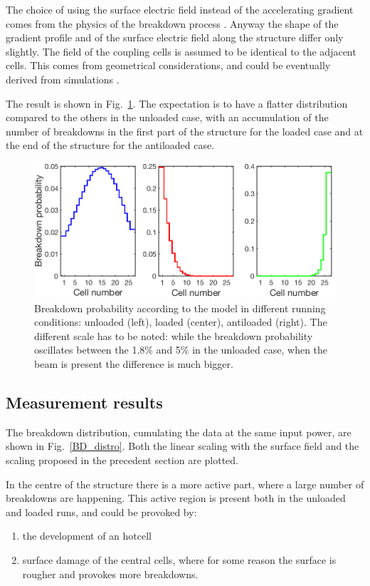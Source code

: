 The choice of using the surface electric field instead of the accelerating gradient comes from the physics of the breakdown process \cite{Walter:PC}. Anyway the shape of the gradient profile and of the surface electric field along the structure differ only slightly. The field of the coupling cells is assumed to be identical to the adjacent cells. This comes from geometrical considerations, and could be eventually derived from simulations \cite{Alexej:PC}.

The result is shown in Fig.~\ref{BD_prob}. The expectation is to have a flatter distribution compared to the others in the unloaded case, with an accumulation of the number of breakdowns in the first part of the structure for the loaded case and at the end of the structure for the antiloaded case.


\begin{figure}[h]
\centering 
\includegraphics[scale=0.45]{pictures/BD_probability_2.png}
\caption{Breakdown probability according to the model in different running conditions: unloaded (left), loaded (center), antiloaded (right). The different scale has to be noted: while the breakdown probability oscillates between the 1.8\% and 5\% in the unloaded case, when the beam is present the difference is much bigger.}
\label{BD_prob}
\end{figure}


\subsection[Measurement results]{Measurement results}

The breakdown distribution, cumulating the data at the same input power, are shown in Fig.~\ref{BD_distro}. Both the linear scaling with the surface field and the scaling proposed in the precedent section are plotted.

In the centre of the structure there is a more active part, where a large number of breakdowns are happening. This active region is present both in the unloaded and loaded runs, and could be provoked by: 
\begin{enumerate}
\item the development of an hotcell
\item surface damage of the central cells, where for some reason the surface is rougher and provokes more breakdowns. 
\end{enumerate}

